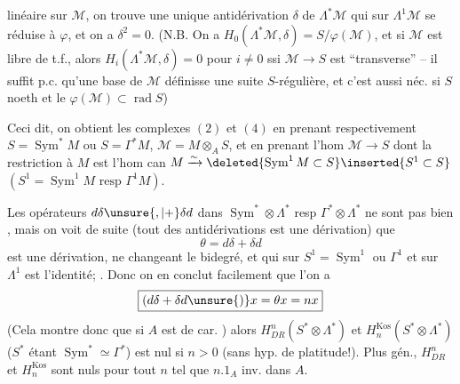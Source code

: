 linéaire sur $\mathcal M$, on trouve une unique antidérivation $\delta$ de $\Lambda^*\mathcal M$ qui sur $\Lambda^1\mathcal M$ se réduise à $\varphi$, et on a $\delta^2=0$. (N.B. On a $H_0(\Lambda^*\mathcal M,\delta)=S/\varphi(\mathcal M)$, et si $\mathcal M$ est libre de t.f., alors $H_i(\Lambda^*\mathcal M,\delta)=0$ pour $i\neq0$ ssi $\mathcal M\longrightarrow S$ est ``transverse'' -- il suffit p.c. qu'une base  de $\mathcal M$ définisse une suite $S$-régulière, et c'est aussi néc. si $S$ noeth et le $\varphi(\mathcal M)\subset\operatorname{rad}S$)

Ceci dit, on obtient les complexes $(2)$ et $(4)$ en prenant respectivement $S=\operatorname{Sym}^*M$ ou $S=\Gamma^*M$, $\mathcal M=M\otimes_A S$, et en prenant l'hom $\mathcal M\longrightarrow S$  dont la restriction à $M$ est l'hom can $M\xrightarrow{\sim}\deleted{\operatorname{Sym}^1M\subset S}\inserted{S^1\subset S}$  $(S^1=\operatorname{Sym}^1M\text{ resp }\Gamma^1M)$.

Les opérateurs $d\delta\unsure{,|+}\delta d$ dans $\operatorname{Sym}^*\otimes\Lambda^*$ resp $\Gamma^*\otimes\Lambda^*$ ne sont pas bien , mais on voit de suite (tout  des antidérivations est une dérivation) que
\[
\theta=d\delta+\delta d
\]
est une dérivation,   ne changeant  le bidegré, et qui sur  $S^1=\operatorname{Sym}^1$ ou $\Gamma^1$ et sur $\Lambda^1$ est l'identité; . Donc on en conclut facilement que l'on a
\[
\boxed{(d\delta+\delta d\unsure{)}x=\theta x=nx}
\]
(Cela montre donc que si $A$ est de car. ) alors $H^n_{DR}(S^*\otimes\Lambda^*)$ et $H_n^{\mathrm{Kos}}(S^*\otimes\Lambda^*)$ ($S^*$ étant $\operatorname{Sym}^*\simeq\Gamma^*$) est nul si  $n>0$ (sans hyp. de platitude!). Plus gén., $H^n_{DR}$ et $H_n^{\mathrm{Kos}}$ sont nuls pour tout $n$ tel que $n.1_A$ inv. dans $A$.
